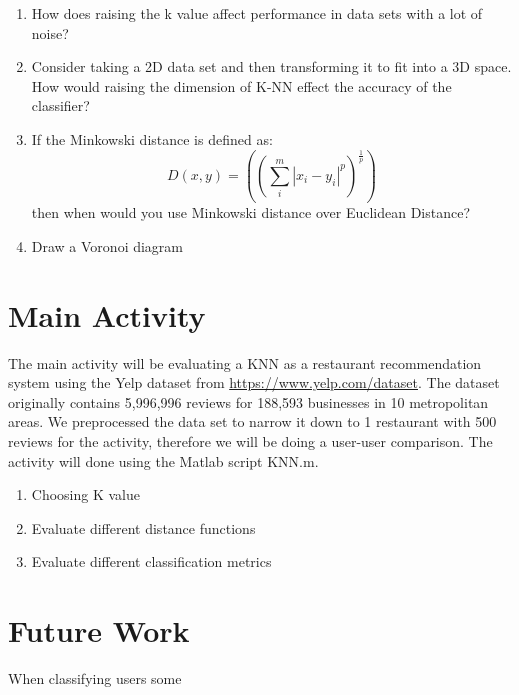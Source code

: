 \documentclass{report}
\begin{document}
\begin{enumerate}
\begin{figure}[H]
	\end{figure}
	\item How does raising the k value affect performance in data sets with a lot of noise? 
	\item Consider taking a 2D data set and then transforming it to fit into a 3D space. How would raising the dimension of K-NN effect the accuracy of the classifier?
	\item If the Minkowski distance is defined as: 
	\begin{equation}
	D (x, y) = ((\sum_{i}^{m}| x_{i} - y_{i}|^p)^\frac{1}{p})
	\end{equation}
     then when would you use Minkowski distance over Euclidean Distance?
	

\item Draw a Voronoi diagram
\end{enumerate}

\section*{Main Activity}

The main activity will be evaluating a KNN as a restaurant recommendation system using the Yelp dataset from \href{https://www.yelp.com/dataset}{https://www.yelp.com/dataset}.
The dataset originally contains 5,996,996 reviews for 188,593 businesses in 10 metropolitan areas.
We preprocessed the data set to narrow it down to 1 restaurant with 500 reviews for the activity, therefore we will be doing a user-user comparison.  
The activity will done using the Matlab script KNN.m.

\begin{enumerate}

\item Choosing K value

\item Evaluate different distance functions

\item Evaluate different classification metrics

\end{enumerate}

\section*{Future Work}
When classifying users some 
\end{document}
